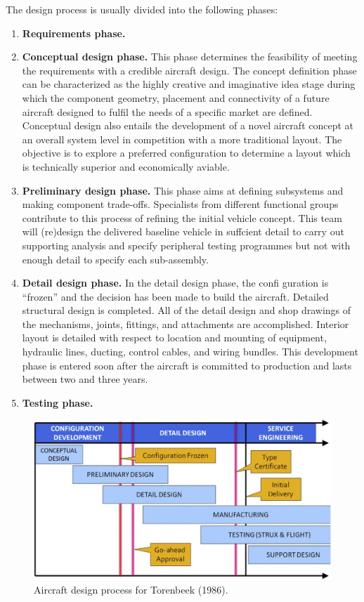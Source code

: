 The design process is usually divided into the following phases:

\begin{enumerate}
\item {\bfseries Requirements phase.}
\item {\bfseries Conceptual design phase.} This phase determines the feasibility of meeting the requirements with a credible aircraft design. The concept definition phase can be characterized as the highly creative and imaginative idea stage during which the component geometry, placement and connectivity of a future aircraft designed to fulfil the needs of a specific market are defined. Conceptual design also entails the development of a novel aircraft concept at an overall system level in competition with a more traditional layout. The objective is to explore a preferred configuration to determine a layout which is technically superior and economically aviable.
\item {\bfseries Preliminary design phase.} This phase aims at defining subsystems and making component trade-offs. Specialists from different functional groups contribute to this process of refining the initial vehicle concept. This team will (re)design the delivered baseline vehicle in suffcient detail to carry out supporting analysis and specify peripheral testing programmes but not with enough detail to specify each sub-assembly.
\item {\bfseries Detail design phase.} In the detail design phase, the confi guration is ``frozen'' and the decision has been made to build the aircraft. Detailed structural design is completed. All of the detail design and shop drawings of the mechanisms, joints, fittings, and attachments are accomplished. Interior layout is detailed with respect to location and mounting of equipment, hydraulic lines, ducting, control cables, and wiring bundles. This development phase is entered soon after the aircraft is committed to production and lasts between two and three years.
\item {\bfseries Testing phase.}
\end{enumerate}

\begin{figure}[H]
\centering
\includegraphics[height = 6 cm ]{Immagini/Process_Design_Torenbeek}
\caption{Aircraft design process for Torenbeek (\num{1986}).}
\label{fig:2}
\end{figure}


